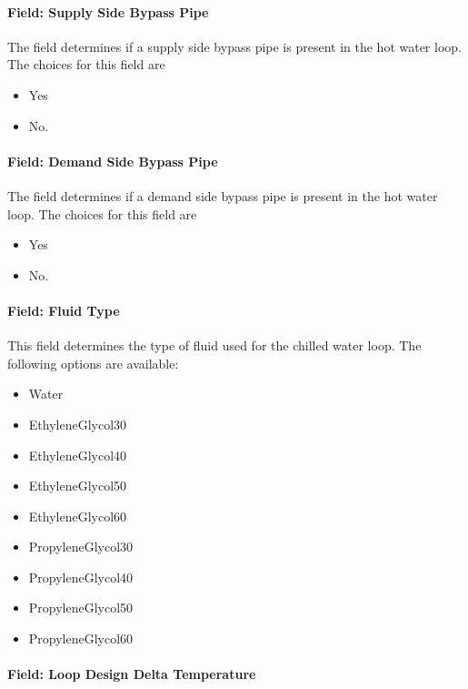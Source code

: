 \paragraph{Field: Supply Side Bypass Pipe}\label{field-supply-side-bypass-pipe}

The field determines if a supply side bypass pipe is present in the hot water loop. The choices for this field are

\begin{itemize}
\item
  Yes
\item
  No.
\end{itemize}

\paragraph{Field: Demand Side Bypass Pipe}\label{field-demand-side-bypass-pipe}

The field determines if a demand side bypass pipe is present in the hot water loop. The choices for this field are

\begin{itemize}
\item
  Yes
\item
  No.
\end{itemize}

\paragraph{Field: Fluid Type}\label{field-fluid-type-1}

This field determines the type of fluid used for the chilled water loop. The following options are available:

\begin{itemize}
\item
  Water
\item
  EthyleneGlycol30
\item
  EthyleneGlycol40
\item
  EthyleneGlycol50
\item
  EthyleneGlycol60
\item
  PropyleneGlycol30
\item
  PropyleneGlycol40
\item
  PropyleneGlycol50
\item
  PropyleneGlycol60
\end{itemize}

\paragraph{Field: Loop Design Delta Temperature}\label{field-loop-design-delta-temperature-1}

